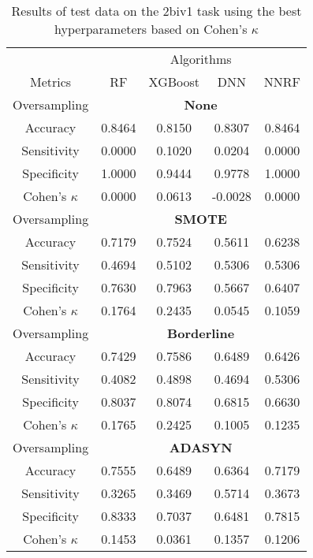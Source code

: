 \begin{table}[!htb]
\centering
\caption{Results of test data on the 2biv1 task using the best hyperparameters based on Cohen's $\kappa$}
\label{tab:2biv1_test_results}
\begin{tabular}{c | c c c c}
\hline
 & \multicolumn{4}{c}{Algorithms}\\ 
Metrics &RF & XGBoost & DNN & NNRF\\ 
\hline
Oversampling &\multicolumn{4}{|c}{\textbf{None}}\\ 
\hline
Accuracy & 0.8464 & 0.8150 & 0.8307 & 0.8464\\ 
Sensitivity & 0.0000 & 0.1020 & 0.0204 & 0.0000\\ 
Specificity & 1.0000 & 0.9444 & 0.9778 & 1.0000\\ 
Cohen's $\kappa$ & 0.0000 & 0.0613 & -0.0028 & 0.0000\\ 
\hline
Oversampling &\multicolumn{4}{|c}{\textbf{SMOTE}}\\ 
\hline
Accuracy & 0.7179 & 0.7524 & 0.5611 & 0.6238\\ 
Sensitivity & 0.4694 & 0.5102 & 0.5306 & 0.5306\\ 
Specificity & 0.7630 & 0.7963 & 0.5667 & 0.6407\\ 
Cohen's $\kappa$ & 0.1764 & 0.2435 & 0.0545 & 0.1059\\ 
\hline
Oversampling &\multicolumn{4}{|c}{\textbf{Borderline}}\\ 
\hline
Accuracy & 0.7429 & 0.7586 & 0.6489 & 0.6426\\ 
Sensitivity & 0.4082 & 0.4898 & 0.4694 & 0.5306\\ 
Specificity & 0.8037 & 0.8074 & 0.6815 & 0.6630\\ 
Cohen's $\kappa$ & 0.1765 & 0.2425 & 0.1005 & 0.1235\\ 
\hline
Oversampling &\multicolumn{4}{|c}{\textbf{ADASYN}}\\ 
\hline
Accuracy & 0.7555 & 0.6489 & 0.6364 & 0.7179\\ 
Sensitivity & 0.3265 & 0.3469 & 0.5714 & 0.3673\\ 
Specificity & 0.8333 & 0.7037 & 0.6481 & 0.7815\\ 
Cohen's $\kappa$ & 0.1453 & 0.0361 & 0.1357 & 0.1206\\ 
\hline
\end{tabular}
\end{table}

